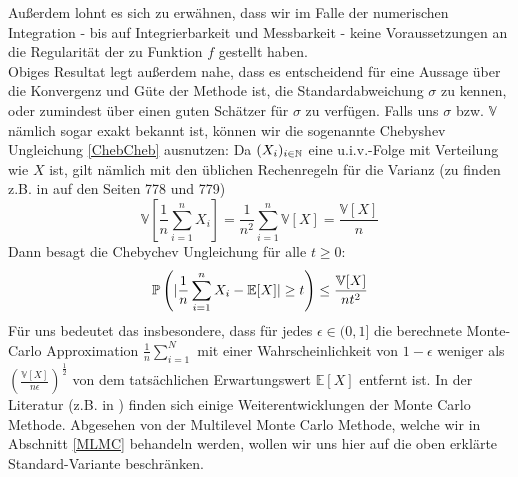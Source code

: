  	Außerdem lohnt es sich zu erwähnen, dass wir im Falle der numerischen Integration - bis auf Integrierbarkeit und Messbarkeit - keine Voraussetzungen an die Regularität der zu Funktion $ f $ gestellt haben.\\
 	Obiges Resultat legt außerdem nahe, dass es entscheidend für eine Aussage über die Konvergenz und Güte der Methode ist, die Standardabweichung $ \sigma $ zu kennen, oder zumindest über einen guten Schätzer für $ \sigma $ zu verfügen.
 	Falls uns $ \sigma $ bzw. $ \mathbb{V} $ nämlich sogar exakt bekannt ist, können wir die sogenannte Chebyshev Ungleichung \ref{ChebCheb} ausnutzen:
 	Da $ (X_i)_{i \in \mathbb{N}} $ eine u.i.v.-Folge mit Verteilung wie $ X $ ist, gilt nämlich mit den üblichen Rechenregeln für die Varianz (zu finden z.B. in \cite{brokate2016grundwissen} auf den Seiten 778 und 779)
 	\[
 		\mathbb{V}[\frac{1}{n}\sum_{i=1}^{n}X_i] =  \frac{1}{n^2} \sum_{i=1}^{n} \mathbb{V}[X] = \frac{\mathbb{V}[X]}{n}
 	\]
 	Dann besagt die Chebychev Ungleichung für alle $ t \geq 0 $:
 	\[
 		\mathbb{P}\left(| \frac{1}{n}\sum_{i=1}^{n}X_i-\mathbb{E}[X] | \geq t \right) \leq \frac{\mathbb{V}[X]}{nt^2}
 	\]
 	Für uns bedeutet das insbesondere, dass für jedes $ \epsilon \in (0,1] $  die berechnete Monte-Carlo Approximation $ \frac{1}{n}\sum_{i=1}^{N} $ mit einer Wahrscheinlichkeit von $ 1-\epsilon $ weniger als $ \left( \frac{\mathbb{V}[X]}{n\epsilon}\right)^{\frac{1}{2}} $ von dem tatsächlichen Erwartungswert $ \mathbb{E}[X] $ entfernt ist.
 	In der Literatur (z.B. in \cite{sullivan2015introduction}) finden sich einige Weiterentwicklungen der Monte Carlo Methode. Abgesehen von der Multilevel Monte Carlo Methode, welche wir in Abschnitt \ref{MLMC} behandeln werden, wollen wir uns hier auf die oben erklärte Standard-Variante beschränken.
 	
 
 	
	
	
	


